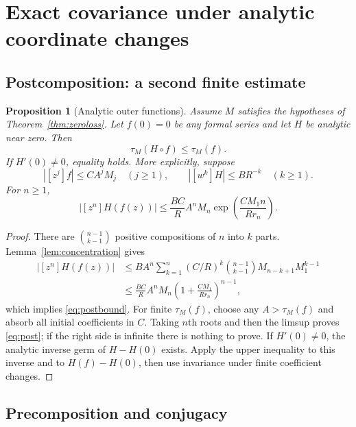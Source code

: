 \documentclass[11pt,a4paper]{article}
\numberwithin{equation}{section}
\newtheorem{proposition}[theorem]{Proposition}
\theoremstyle{definition}
\theoremstyle{remark}
\newcommand{\typ}{\tau_M}
\begin{document}
\section{Exact covariance under analytic coordinate changes}
\label{sec:coordinates}

\subsection{Postcomposition: a second finite estimate}

\begin{proposition}[Analytic outer functions]
\label{prop:post}
Assume $M$ satisfies the hypotheses of Theorem~\ref{thm:zeroloss}.
Let $f(0)=0$ be any formal series and let $H$ be analytic near zero.
Then
\begin{equation}
 \typ(H\circ f)\le\typ(f).
 \label{eq:post}
\end{equation}
If $H'(0)\ne0$, equality holds.
More explicitly, suppose
\[
 |[z^j]f|\le CA^jM_j\quad(j\ge1),\qquad
 |[w^k]H|\le BR^{-k}\quad(k\ge1).
\]
For $n\ge1$,
\begin{equation}
 |[z^n]H(f(z))|
 \le\frac{BC}{R}A^nM_n
 \exp\left(\frac{CM_1n}{Rr_n}\right).
 \label{eq:postbound}
\end{equation}
\end{proposition}
\begin{proof}
There are $\binom{n-1}{k-1}$ positive compositions of $n$ into $k$
parts. Lemma~\ref{lem:concentration} gives
\begin{align*}
 |[z^n]H(f(z))|
 &\le B A^n\sum_{k=1}^n (C/R)^k
    \binom{n-1}{k-1}M_{n-k+1}M_1^{k-1}\\
 &\le\frac{BC}{R}A^nM_n
    \left(1+\frac{CM_1}{Rr_n}\right)^{n-1},
\end{align*}
which implies \eqref{eq:postbound}. For finite $\typ(f)$, choose any
$A>\typ(f)$ and absorb all initial coefficients in $C$. Taking $n$th
roots and then the limsup proves \eqref{eq:post}; if the right side is
infinite there is nothing to prove. If $H'(0)\ne0$, the analytic inverse
germ of $H-H(0)$ exists. Apply the upper inequality to this inverse and
to $H(f)-H(0)$, then use invariance under finite coefficient changes.
\end{proof}

\subsection{Precomposition and conjugacy}
\end{document}
